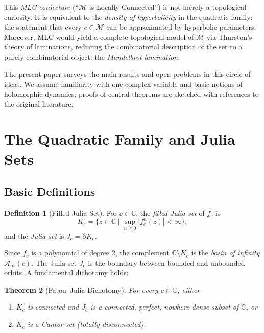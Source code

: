 \documentclass[12pt,a4paper]{amsart}
\newtheorem{theorem}{Theorem}[section]
\theoremstyle{definition}
\newtheorem{definition}[theorem]{Definition}
\theoremstyle{remark}
\begin{document}
This \emph{MLC conjecture} (``$\mathcal{M}$ is Locally Connected'') is not
merely a topological curiosity. It is equivalent to the \emph{density of
hyperbolicity} in the quadratic family: the statement that every $c \in \mathcal{M}$
can be approximated by hyperbolic parameters. Moreover, MLC would yield a
complete topological model of $\mathcal{M}$ via Thurston's theory of
laminations, reducing the combinatorial description of the set to a
purely combinatorial object: the \emph{Mandelbrot lamination}.

The present paper surveys the main results and open problems in this circle
of ideas. We assume familiarity with one complex variable and basic notions
of holomorphic dynamics; proofs of central theorems are sketched with
references to the original literature.

\section{The Quadratic Family and Julia Sets}

\subsection{Basic Definitions}

\begin{definition}[Filled Julia Set]
For $c \in \mathbb{C}$, the \emph{filled Julia set} of $f_c$ is
\[
    K_c = \{ z \in \mathbb{C} \mid \sup_{n \geq 0} |f_c^n(z)| < \infty \},
\]
and the \emph{Julia set} is $J_c = \partial K_c$.
\end{definition}

Since $f_c$ is a polynomial of degree 2, the complement
$\mathbb{C} \setminus K_c$ is the \emph{basin of infinity}
$\mathcal{A}_\infty(c)$. The Julia set $J_c$ is the boundary between
bounded and unbounded orbits. A fundamental dichotomy holds:

\begin{theorem}[Fatou--Julia Dichotomy]
For every $c \in \mathbb{C}$, either
\begin{enumerate}[label=\roman*)]
\item $K_c$ is connected and $J_c$ is a connected, perfect, nowhere
      dense subset of $\mathbb{C}$, or
\item $K_c$ is a Cantor set (totally disconnected).
\end{enumerate}
\end{theorem}
\end{document}
